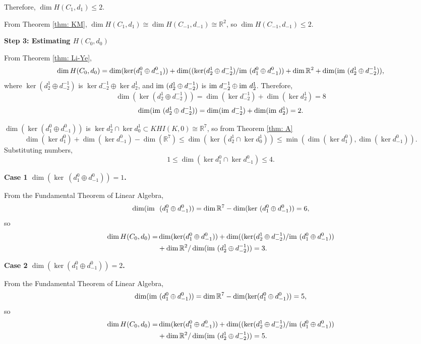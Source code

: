 \documentclass{amsart}
\theoremstyle{definition}
\newcommand{\im}{{\rm im~}}
\begin{document}
\bigskip
Therefore,
$\dim H(C_1,d_1) \leq 2$.

From Theorem \ref{thm: KM}, 
$\dim H(C_1,d_1) \cong \dim H(C_{-1},d_{-1}) \cong \mathbb{R}^2$, so
 $\dim H(C_{-1},d_{-1}) \leq2$.


\bigskip
\textbf{Step 3: Estimating $H(C_0,d_0)$} 

From Theorem \ref{thm: Li-Ye},
$$\dim H(C_0,d_0)= 
\dim(\ker (d^0_1\oplus d^0_{-1}))
+
\dim((\ker (d^1_2\oplus d^{-1}_{-2})/\im(d^0_1\oplus d^0_{-1}))
+
\dim \mathbb{R}^2
+
\dim (\im (d^1_2\oplus d^{-1}_{-2}))
,$$
where
$\ker (d^1_2\oplus d^{-1}_{-2})$ is $\ker d^{-1}_{-2} \oplus \ker d^{1}_{2}$, and $\im (d^1_2\oplus d^{-1}_{-2})$ is $\im d^{-1}_{-2} \oplus \im d^{1}_{2}$.
Therefore,
$$\dim(\ker (d^1_2\oplus d^{-1}_{-2})) = \dim (\ker d^{-1}_{-2}) + \dim (\ker d^{1}_{2}) = 8$$
$$\dim(\im (d^1_2\oplus d^{-1}_{-2})) = \dim (\im d^{-1}_{-2}) + \dim (\im d^{1}_{2}) = 2.$$

$\dim(\ker (d^0_1\oplus d^0_{-1}))$ is $\ker d^{1}_{2} \cap \ker d^1_0 \subset KHI(K,0)\cong \mathbb{R}^7$, so from Theorem \ref{thm: A}
$$\dim (\ker d^0_{1})
+ 
\dim (\ker d^0_{-1} )
- 
\dim (\mathbb{R}^7)
\leq
\dim (\ker (d^{1}_{2} \cap \ker d^1_0))
\leq
\min (\dim (\ker d^0_{1}),\dim (\ker d^0_{-1})).
$$
Substituting numbers,
$$1\leq {\dim (\ker d^0_{1} \cap \ker d^0_{-1}) }\leq 4.$$

\textbf{Case 1 $\dim(\ker~(d^0_1\oplus d^0_{-1}))= 1$.}

From the Fundamental Theorem of Linear Algebra,
$$\dim(\im~(d^0_1\oplus d^0_{-1}))= \dim \mathbb{R}^7-\dim(\ker~(d^0_1\oplus d^0_{-1}))=6,$$
so
\begin{equation*}
    \begin{aligned}
       \dim H(C_0,d_0)= 
        &\dim(\ker (d^0_1\oplus d^0_{-1}))
        +
        \dim((\ker (d^1_2\oplus d^{-1}_{-2})/\im(d^0_1\oplus d^0_{-1}))\\
        &+
        \dim \mathbb{R}^2/\dim (\im (d^1_2 \oplus d^{-1}_{-2}))
        =3.
    \end{aligned}
\end{equation*}


\textbf{Case 2 $\dim(\ker (d^0_1\oplus d^0_{-1}))= 2$.}

From the Fundamental Theorem of Linear Algebra,
$$\dim(\im (d^0_1\oplus d^0_{-1}))= \dim \mathbb{R}^7-\dim(\ker (d^0_1\oplus d^0_{-1}))=5,$$
so
\begin{equation*}
    \begin{aligned}
       \dim H(C_0,d_0)= 
        &\dim(\ker (d^0_1\oplus d^0_{-1}))
        +
        \dim((\ker (d^1_2\oplus d^{-1}_{-2})/\im(d^0_1\oplus d^0_{-1}))\\
        &+
        \dim \mathbb{R}^2/\dim (\im (d^1_2 \oplus d^{-1}_{-2}))
        =5.
    \end{aligned}
\end{equation*}
\end{document}

